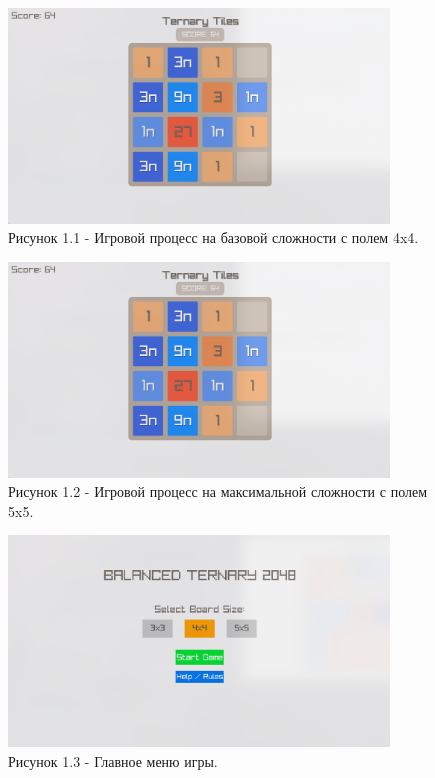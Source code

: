 \documentclass[oneside,a4paper,14pt]{extarticle}
\begin{document}
\begin{figure}[H]
	\centering
	\includegraphics[width=0.9\textwidth]{pics/screen4x4.png}
	\caption*{Рисунок 1.1 - Игровой процесс на базовой сложности с полем 4x4.}
\end{figure}

\begin{figure}[H]
	\centering
	\includegraphics[width=0.9\textwidth]{pics/screen4x4.png}
	\caption*{Рисунок 1.2 - Игровой процесс на максимальной сложности с полем 5x5.}
\end{figure}

\begin{figure}[H]
	\centering
	\includegraphics[width=0.9\textwidth]{pics/menu.png}
	\caption*{Рисунок 1.3 - Главное меню игры.}
\end{figure}
\end{document}

